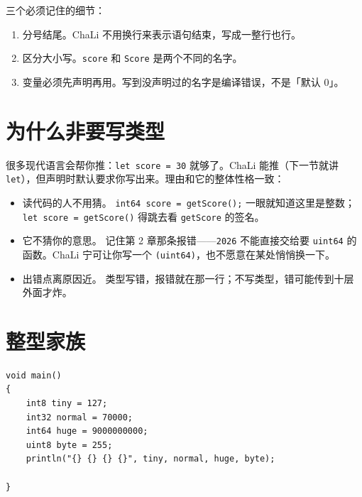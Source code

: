 三个必须记住的细节：

\begin{enumerate}

\item 分号结尾。ChaLi 不用换行来表示语句结束，写成一整行也行。

\item 区分大小写。\texttt{score} 和 \texttt{Score} 是两个不同的名字。

\item 变量必须先声明再用。写到没声明过的名字是编译错误，不是「默认 0」。

\end{enumerate}

\section{为什么非要写类型}

很多现代语言会帮你推：\texttt{let score =\allowbreak{} 30} 就够了。ChaLi 能推（下一节就讲 \texttt{let}），但声明时默认要求你写出来。理由和它的整体性格一致：

\begin{itemize}

\item 读代码的人不用猜。 \texttt{int64 score =\allowbreak{} get\allowbreak{}Score(\allowbreak{})\allowbreak{};} 一眼就知道这里是整数；\texttt{let score =\allowbreak{} get\allowbreak{}Score(\allowbreak{})\allowbreak{}} 得跳去看 \texttt{get\allowbreak{}Score} 的签名。

\item 它不猜你的意思。 记住第 2 章那条报错——\texttt{2026} 不能直接交给要 \texttt{uint64} 的函数。ChaLi 宁可让你写一个 \texttt{(\allowbreak{}uint64)\allowbreak{}}，也不愿意在某处悄悄换一下。

\item 出错点离原因近。 类型写错，报错就在那一行；不写类型，错可能传到十层外面才炸。

\end{itemize}

\section{整型家族}

\par
\medskip
\begin{lstlisting}[style=chali]
void main()
{
    int8 tiny = 127;
    int32 normal = 70000;
    int64 huge = 9000000000;
    uint8 byte = 255;
    println("{} {} {} {}", tiny, normal, huge, byte);

}
\end{lstlisting}
\par
\medskip

